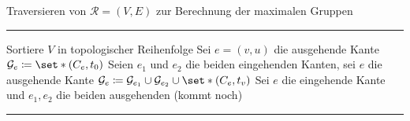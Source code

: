 \begin{algorithm}
	\caption{Traversieren von $\mathcal{R}=(V,E)$ zur Berechnung der maximalen Gruppen}
	\vspace{1em}
	\hrule\vspace{1em}
	
	\begin{algorithmic}
		\State Sortiere $V$ in topologischer Reihenfolge
			 
			\State Sei $e=(v,u)$ die ausgehende Kante
			\State $\mathcal{G}_e \coloneqq \set*{(C_e,t_0)}$
			\State Seien $e_1$ und $e_2$ die beiden eingehenden Kanten, sei $e$ die ausgehende Kante
			\State $\mathcal{G}_e \coloneqq \mathcal{G}_{e_1} \cup \mathcal{G}_{e_2} \cup \set*{(C_e,t_v)}$
			\State Sei $e$ die eingehende Kante und $e_1,e_2$ die beiden ausgehenden
			\State (kommt noch)
			\EndIf
		\EndFor
	\end{algorithmic}
	\hrule
\end{algorithm}




